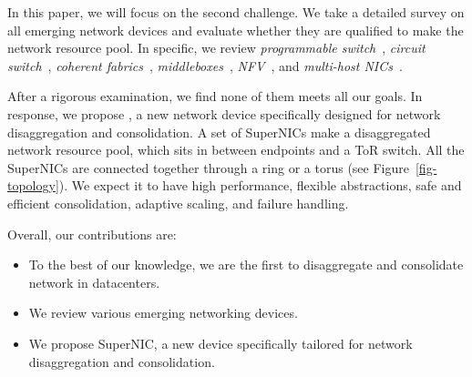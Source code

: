 In this paper, we will focus on the second challenge.
We take a detailed survey on all emerging network devices
and evaluate whether they are qualified to make the network resource pool.
In specific, we review
\textit{programmable switch}~\cite{netcache-sosp17,incbricks-asplos17,distcache-fast19,pegasus-osdi20,hpcc-sigcomm19,netlock-sigcomm20,cheetah-sigmod20,racksched-osdi20,tea-sigcomm20},
\textit{circuit switch}~\cite{helios-sigcomm10,mordia-sigcomm13,reactor-nsdi14,rotornet-sigcomm17,sirius-sigcomm20,dRedBox-DATE,shoal-nsdi19},
\textit{coherent fabrics}~\cite{GenZ,OpenCAPI,CCIX,CXL},
\textit{middleboxes}~\cite{walfish-osdi04,comb-nsdi12,aplomb-sigcomm20},
\textit{NFV}~\cite{clickos-nsdi14,e2,netbricks,resq-nsdi18,metron-nsdi18,flowblaze-nsdi19,panic-osdi20,azure-nsdi18},
and \textit{multi-host NICs}~\cite{Intel-RedRockCanyon,Mellanox-Multihost}.

After a rigorous examination, we find none of them meets all our goals.
In response, we propose \sysname, a new network device specifically
designed for network disaggregation and consolidation.
A set of SuperNICs make a disaggregated network resource pool,
which sits in between endpoints and a ToR switch.
All the SuperNICs are connected together through a ring or a torus (see Figure~\ref{fig-topology}).
We expect it to have high performance, flexible abstractions,
safe and efficient consolidation, adaptive scaling, and failure handling.


Overall, our contributions are:
\begin{itemize}
\vspace{-0.05in}
\item To the best of our knowledge, we are the first to
disaggregate and consolidate network in datacenters.
\vspace{-0.05in}
\item We review various emerging networking devices.
\vspace{-0.05in}
\item We propose SuperNIC, a new device specifically tailored for network disaggregation and consolidation.
\end{itemize}

\fi

